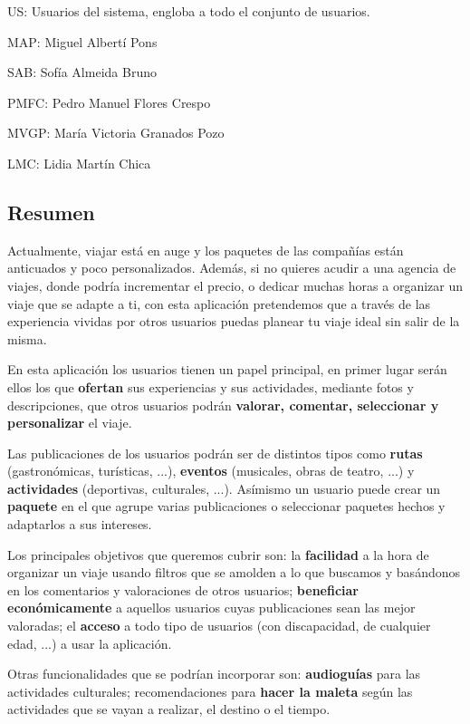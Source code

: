\documentclass[11pt]{article}
\begin{document}
US: Usuarios del sistema, engloba a todo el conjunto de usuarios.

MAP: Miguel Albertí Pons

SAB: Sofía Almeida Bruno

PMFC: Pedro Manuel Flores Crespo

MVGP: María Victoria Granados Pozo

LMC: Lidia Martín Chica



\subsection{Resumen}
Actualmente, viajar está en auge y los paquetes de las compañías están anticuados y poco personalizados. Además, si no quieres acudir a una agencia de viajes, donde podría incrementar el precio, o dedicar muchas horas a organizar un viaje que se adapte a ti, con esta aplicación pretendemos que a través de las experiencia vividas por otros usuarios puedas planear tu viaje ideal sin salir de la misma.

En esta aplicación los usuarios tienen un papel principal, en primer lugar serán ellos los que \textbf{ofertan} sus experiencias y sus actividades, mediante fotos y descripciones, que otros usuarios podrán \textbf{valorar, comentar, seleccionar y personalizar} el viaje.

Las publicaciones de los usuarios podrán ser de distintos tipos como \textbf{rutas} (gastronómicas, turísticas, ...), \textbf{eventos} (musicales, obras de teatro, ...) y \textbf{actividades} (deportivas, culturales, ...). Asímismo un usuario puede crear un \textbf{paquete} en el que agrupe varias publicaciones o seleccionar paquetes hechos y adaptarlos a sus intereses.

Los principales objetivos que queremos cubrir son: la \textbf{facilidad} a la hora de organizar un viaje usando filtros que se amolden a lo que buscamos y basándonos en los comentarios y valoraciones de otros usuarios; \textbf{beneficiar económicamente} a aquellos usuarios cuyas publicaciones sean las mejor valoradas; el \textbf{acceso} a todo tipo de usuarios (con discapacidad, de cualquier edad, ...) a usar la aplicación.

Otras funcionalidades que se podrían incorporar son: \textbf{audioguías} para las actividades culturales; recomendaciones para \textbf{hacer la maleta} según las actividades que se vayan a realizar, el destino o el tiempo.

\newpage
\end{document}

